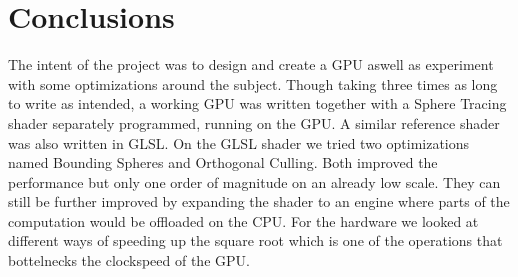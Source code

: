 \chapter{Conclusions}

The intent of the project was to design and create a GPU aswell as experiment
with some optimizations around the subject. Though taking three times as long
to write as intended, a working GPU was written together with a Sphere Tracing
shader separately programmed, running on the GPU. A similar reference shader
was also written in GLSL. On the GLSL shader we tried two optimizations named
Bounding Spheres and Orthogonal Culling. Both improved the performance but only
one order of magnitude on an already low scale. They can still be further
improved by expanding the shader to an engine where parts of the computation
would be offloaded on the CPU. For the hardware we looked at different ways of
speeding up the square root which is one of the operations that bottelnecks the
clockspeed of the GPU. 
